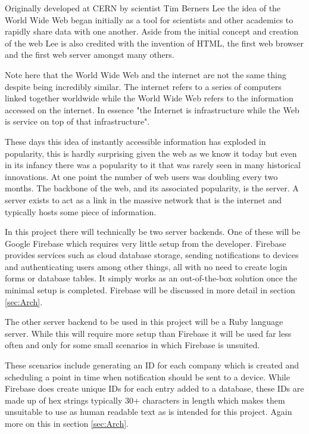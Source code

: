 Originally developed at CERN by scientist Tim Berners Lee\cite{restapidesigntimebernersleereference} the idea of the World Wide Web began initially as a tool for scientists and other academics to rapidly share data with one another\cite{cernwebbirth}. Aside from the initial concept and creation of the web Lee is also credited with the invention of HTML, the first web browser and the first web server amongst many others\cite{restapidesigntimebernersleereference}.

Note here that the World Wide Web and the internet are not the same thing despite being incredibly similar. The internet refers to a series of computers linked together worldwide while the World Wide Web refers to the information accessed on the internet. In essence "the Internet is infrastructure while the Web is service on top of that infrastructure"\cite{webinternetdifference}.

These days this idea of instantly accessible information has exploded in popularity, this is hardly surprising given the web as we know it today but even in its infancy there was a popularity to it that was rarely seen in many historical innovations. At one point the number of web users was doubling every two months\cite{restapidesignwebusersreference}. The backbone of the web, and its associated popularity, is the server. A server exists to act as a link in the massive network that is the internet and typically hosts some piece of information.

In this project there will technically be two server backends. One of these will be Google Firebase which requires very little setup from the developer. Firebase provides services such as cloud database storage, sending notifications to devices and authenticating users among other things, all with no need to create login forms or database tables. It simply works as an out-of-the-box solution once the minimal setup is completed. Firebase will be discussed in more detail in section \ref{sec:Arch}.

The other server backend to be used in this project will be a Ruby language server. While this will require more setup than Firebase it will be used far less often and only for some small scenarios in which Firebase is unsuited. 

These scenarios include generating an ID for each company which is created and scheduling a point in time when notification should be sent to a device. While Firebase does create unique IDs for each entry added to a database, these IDs are made up of hex strings typically 30+ characters in length which makes them unsuitable to use as human readable text as is intended for this project. Again more on this in section \ref{sec:Arch}.

